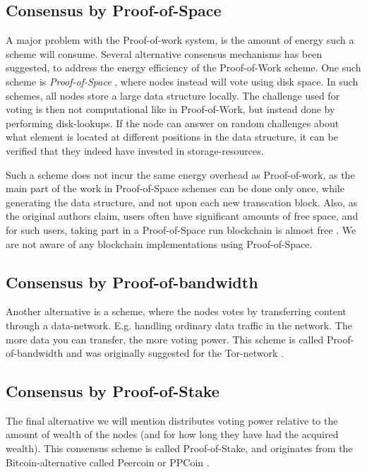 \documentclass[oneside,a4paper,10pts,article]{memoir}
\begin{document}
\subsection{Consensus by Proof-of-Space}
A major problem with the Proof-of-work system, is the amount of energy
such a scheme will consume. Several alternative consensus mechanisms
has been suggested, to address the energy efficiency of the
Proof-of-Work scheme. One such scheme is \emph{Proof-of-Space}
\cite{dziembowski2015proofs}, where nodes instead will vote using disk
space. In such schemes, all nodes store a large data structure
locally. The challenge used for voting is then not computational like
in Proof-of-Work, but instead done by performing disk-lookups. If the
node can answer on random challenges about what element is located at
different positions in the data structure, it can be verified that
they indeed have invested in storage-resources.

Such a scheme does not incur the same energy overhead as
Proof-of-work, as the main part of the work in Proof-of-Space schemes
can be done only once, while generating the data structure, and not
upon each new transcation block. Also, as the original authors claim,
users often have significant amounts of free space, and for such
users, taking part in a Proof-of-Space run blockchain is almost free
\cite{dziembowski2015proofs}. We are not aware of any blockchain
implementations using Proof-of-Space.

\subsection{Consensus by Proof-of-bandwidth}
Another alternative is a scheme, where the nodes votes by transferring
content through a data-network. E.g. handling ordinary data traffic in
the network. The more data you can transfer, the more voting
power. This scheme is called Proof-of-bandwidth and was originally
suggested for the Tor-network \cite{ghosh2014torpath}.

\subsection{Consensus by Proof-of-Stake}
The final alternative we will mention distributes voting power
relative to the amount of wealth of the nodes (and for how long they
have had the acquired wealth). This consensus scheme is called
Proof-of-Stake, and originates from the Bitcoin-alternative called
Peercoin or PPCoin \cite{king2012ppcoin}.
\end{document}
